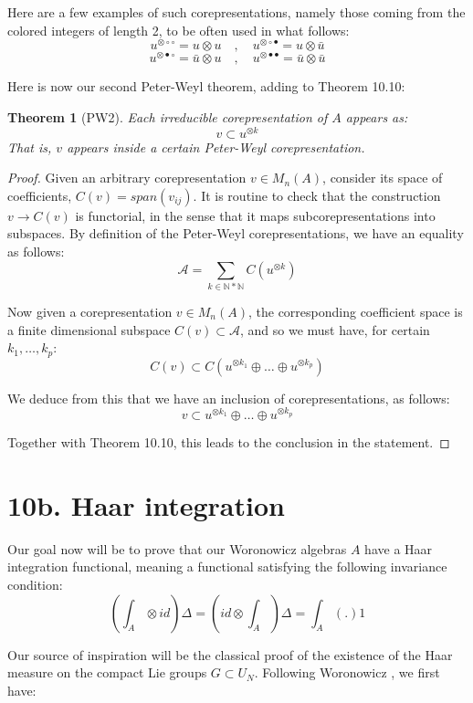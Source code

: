 \documentclass[12pt]{amsbook}
\newtheorem{theorem}{Theorem}[chapter]
\begin{document}
Here are a few examples of such corepresentations, namely those coming from the colored integers of length 2, to be often used in what follows:
$$u^{\otimes\circ\circ}=u\otimes u\quad,\quad 
u^{\otimes\circ\bullet}=u\otimes\bar{u}$$
$$u^{\otimes\bullet\circ}=\bar{u}\otimes u\quad,\quad 
u^{\otimes\bullet\bullet}=\bar{u}\otimes\bar{u}$$

Here is now our second Peter-Weyl theorem, adding to Theorem 10.10:


\begin{theorem}[PW2]
Each irreducible corepresentation of $A$ appears as:
$$v\subset u^{\otimes k}$$
That is, $v$ appears inside a certain Peter-Weyl corepresentation.
\end{theorem}

\begin{proof}
Given an arbitrary corepresentation $v\in M_n(A)$, consider its space of coefficients, $C(v)=span(v_{ij})$. It is routine to check that the construction $v\to C(v)$ is functorial, in the sense that it maps subcorepresentations into subspaces. By definition of the Peter-Weyl corepresentations, we have an equality as follows:
$$\mathcal A=\sum_{k\in\mathbb N*\mathbb N}C(u^{\otimes k})$$

Now given a corepresentation $v\in M_n(A)$, the corresponding coefficient space is a finite dimensional subspace $C(v)\subset\mathcal A$, and so we must have, for certain $k_1,\ldots,k_p$:
$$C(v)\subset C(u^{\otimes k_1}\oplus\ldots\oplus u^{\otimes k_p})$$

We deduce from this that we have an inclusion of corepresentations, as follows:
$$v\subset u^{\otimes k_1}\oplus\ldots\oplus u^{\otimes k_p}$$

Together with Theorem 10.10, this leads to the conclusion in the statement.
\end{proof}

\section*{10b. Haar integration}

Our goal now will be to prove that our Woronowicz algebras $A$ have a Haar integration functional, meaning a functional satisfying the following invariance condition:
$$\left(\int_A\otimes id\right)\Delta=\left(id\otimes\int_A\right)\Delta=\int_A(.)1$$

Our source of inspiration will be the classical proof of the existence of the Haar measure on the compact Lie groups $G\subset U_N$. Following Woronowicz \cite{wo1}, we first have:
\end{document}
